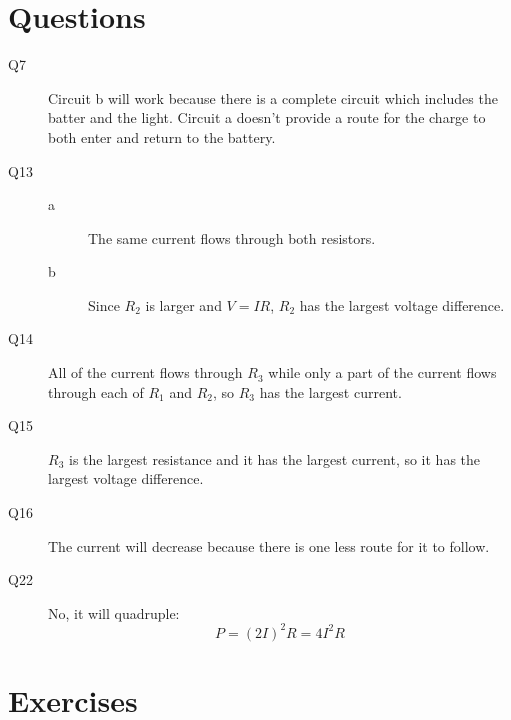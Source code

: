 \documentclass{exam}
\begin{document}
\ifprintanswers

\section{Questions}

\begin{description}

\item[Q7]
Circuit b will work because there is a complete circuit which includes the batter and the light.  Circuit a doesn't
provide a route for the charge to both enter and return to the battery.

\item[Q13]
\begin{description}
\item[a]
The same current flows through both resistors.

\item[b]
Since $R_2$ is larger and $V = IR$, $R_2$ has the largest voltage difference.
\end{description}

\item[Q14]
All of the current flows through $R_3$ while only a part of the current flows through each of $R_1$ and $R_2$, so $R_3$
has the largest current.

\item[Q15]
$R_3$ is the largest resistance and it has the largest current, so it has the largest voltage difference.

\item[Q16]
The current will decrease because there is one less route for it to follow.

\item[Q22]
No, it will quadruple:
\[ 
  P = (2I)^2 R = 4I^2R
\]

\end{description}

\section{Exercises}
\end{document}
